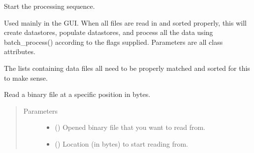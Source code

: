 \documentclass[a4paper,10pt,english]{sphinxmanual}
\begin{document}
\begin{fulllineitems}
\begin{fulllineitems}
\begin{quote}
\begin{description}
\begin{itemize}
\end{itemize}

\end{description}\end{quote}

\end{fulllineitems}


\begin{fulllineitems}
\label{\detokenize{sfgtools:sfgtools.SFGProcessTools.pull_trigger}}
\sphinxAtStartPar
Start the processing sequence.

\sphinxAtStartPar
Used mainly in the GUI. When all files are read in and sorted properly, this will create
datastores, populate datastores, and process all the data using batch\_process() according to the
flags supplied. Parameters are all class attributes.

\sphinxAtStartPar
The lists containing data files all need to be properly matched and sorted for this to make sense.

\end{fulllineitems}


\begin{fulllineitems}
\label{\detokenize{sfgtools:sfgtools.SFGProcessTools.read_at}}
\sphinxAtStartPar
Read a binary file at a specific position in bytes.
\begin{quote}\begin{description}
\item[{Parameters}] \leavevmode\begin{itemize}
\item {} 
\sphinxAtStartPar
{} () \textendash{} Opened binary file that you want to read from.

\item {} 
\sphinxAtStartPar
{} () \textendash{} Location (in bytes) to start reading from.


\end{itemize}
\end{description}
\end{quote}
\end{fulllineitems}
\end{fulllineitems}
\end{document}
